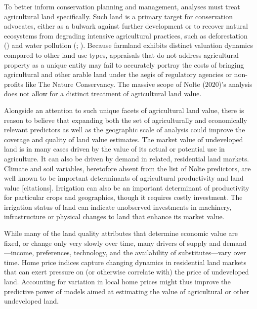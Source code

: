 \documentclass[12pt]{article}
\begin{document}
To better inform conservation planning and management, analyses must treat agricultural land specifically. Such land is a primary target for conservation advocates, either as a bulwark against further development or to recover natural ecosystems from degrading intensive agricultural practices, such as deforestation (\cite{busch2020}) and water pollution (\cite{lupi2020}; \cite{michalak2013}). Because farmland exhibits distinct valuation dynamics compared to other land use types, appraisals that do not address agricultural property as a unique entity may fail to accurately portray the costs of bringing agricultural and other arable land under the aegis of regulatory agencies or non-profits like The Nature Conservancy. The massive scope of Nolte (2020)'s analysis does not allow for a distinct treatment of agricultural land value.

Alongside an attention to such unique facets of agricultural land value, there is reason to believe that expanding both the set of agriculturally and economically relevant predictors as well as the geographic scale of analysis could improve the coverage and quality of land value estimates. The market value of undeveloped land is in many cases driven by the value of its actual or potential use in agriculture. It can also be driven by demand in related, residential land markets. Climate and soil variables, heretofore absent from the list of Nolte predictors, are well known to be important determinants of agricultural productivity and land value [citations]. Irrigation can also be an important determinant of productivity for particular crops and geographies, though it requires costly investment. The irrigation status of land can indicate unobserved investments in machinery, infrastructure or physical changes to land that enhance its market value. 

While many of the land quality attributes that determine economic value are fixed, or change only very slowly over time, many drivers of supply and demand—income, preferences, technology, and the availability of substitutes---vary over time. Home price indices capture changing dynamics in residential land markets that can exert pressure on (or otherwise correlate with) the price of undeveloped land. Accounting for variation in local home prices might thus improve the predictive power of models aimed at estimating the value of agricultural or other undeveloped land. 
\end{document}
